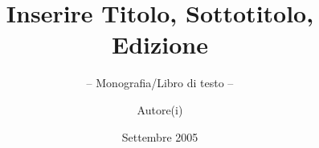 \documentclass[envcountsame,envcountchap]{svmono}
\begin{document}
\author{Autore(i)}
\title{Inserire Titolo, Sottotitolo, Edizione\\
}
\subtitle{-- Monografia/Libro di testo --}
\date{Settembre 2005}
\maketitle

\frontmatter%




\tableofcontents


\mainmatter%


%
%

\backmatter%


\printindex

\end{document}
